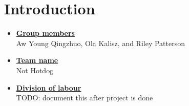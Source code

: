 \newif\ifshowsolutions
\showsolutionstrue

\newcommand{\boldline}[1]{\underline{\textbf{#1}}}



\pagestyle{fancy}



\section{Introduction}
\medskip
\begin{itemize}

    \item \boldline{Group members} \\
    Aw Young Qingzhuo, Ola Kalisz, and Riley Patterson
    
    \item \boldline{Team name} \\
    Not Hotdog
    
    \item \boldline{Division of labour} \\
    TODO: document this after project is done

\end{itemize}



